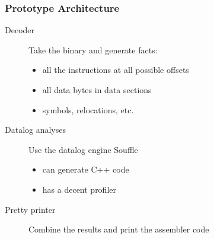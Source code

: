 \documentclass[]{beamer}
\newcommand{\nprocess}[2]{node (p#1) [nprocess]
  {\textit{#2}}}
\newcommand{\oprocess}[2]{node (p#1) [oprocess]
  {\textit{#2}}}
\begin{document}
\begin{frame}
  \frametitle{Prototype Architecture}
  \begin{description}
  \item[Decoder] Take the binary and generate facts:
    \begin{itemize}
    \item all the instructions at all possible offsets
    \item all data bytes in data sections
    \item symbols, relocations, etc.
    \end{itemize}
  \item[Datalog analyses] Use the datalog engine Souffle
    \begin{itemize}
    \item can generate C++ code
    \item has a decent profiler
    \end{itemize}
    
  \item[Pretty printer] Combine the results and print the assembler code
  \end{description}
\end{frame}
\end{document}
